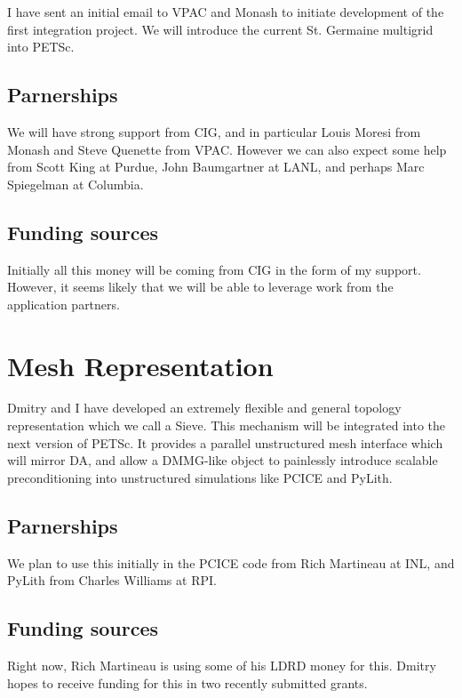 	I have sent an initial email to VPAC and Monash to initiate development of the first integration project. We
will introduce the current St. Germaine multigrid into PETSc.

  \subsection{Parnerships}

	We will have strong support from CIG, and in particular Louis Moresi from Monash and Steve Quenette from VPAC.
However we can also expect some help from Scott King at Purdue, John Baumgartner at LANL, and perhaps Marc Spiegelman at
Columbia.

  \subsection{Funding sources}

	Initially all this money will be coming from CIG in the form of my support. However, it seems likely that we
will be able to leverage work from the application partners.

\section{Mesh Representation}

	Dmitry and I have developed an extremely flexible and general topology representation which we call a Sieve.
This mechanism will be integrated into the next version of PETSc. It provides a parallel unstructured mesh interface
which will mirror DA, and allow a DMMG-like object to painlessly introduce scalable preconditioning into unstructured
simulations like PCICE and PyLith.

  \subsection{Parnerships}

	We plan to use this initially in the PCICE code from Rich Martineau at INL, and PyLith from Charles Williams at
RPI.

  \subsection{Funding sources}

	Right now, Rich Martineau is using some of his LDRD money for this. Dmitry hopes to receive funding for this in
two recently submitted grants.
